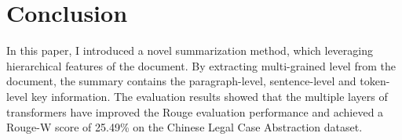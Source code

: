 \documentclass[11pt,a4paper]{article}
\begin{document}
\section{Conclusion}

In this paper, I introduced a novel summarization method, which leveraging hierarchical features of the document.
By extracting multi-grained level from the document, the summary contains the paragraph-level, sentence-level and token-level key information.
The evaluation results showed that the multiple layers of transformers have improved the Rouge evaluation performance
and achieved a Rouge-W score of 25.49\% on the Chinese Legal Case Abstraction dataset.





\end{document}
